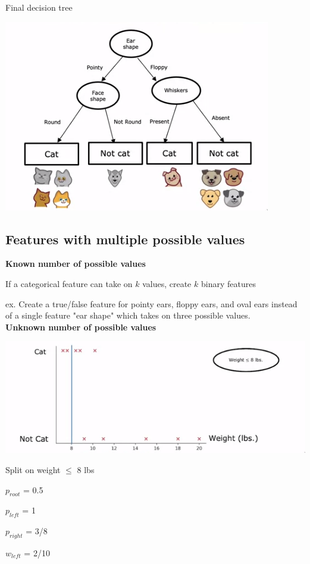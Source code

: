 \documentclass[12pt]{article}
\begin{document}
Final decision tree

\includegraphics[scale=.5]{decision-tree}

\subsection{Features with multiple possible values}

\textbf{Known number of possible values}

If a categorical feature can take on $k$ values, create $k$ binary features

ex. Create a true/false feature for pointy ears, floppy ears, and oval ears instead of a single
feature "ear shape" which takes on three possible values.\\

\textbf{Unknown number of possible values}

\includegraphics[scale=.7]{continuous-tree}

Split on weight $\le$ 8 lbs

$p_{root}$ = 0.5

$p_{left}$ = 1

$p_{right}$ = 3/8

$w_{left}$ = 2/10
\end{document}

